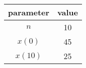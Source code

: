 \begin {tabular}{|c|c|}
\hline
parameter & value \\
\hline
$n$ & 10\\
\hline
$x(0)$ & 45 \\
\hline
$x(10)$ & 25 \\
\hline
\end{tabular}

